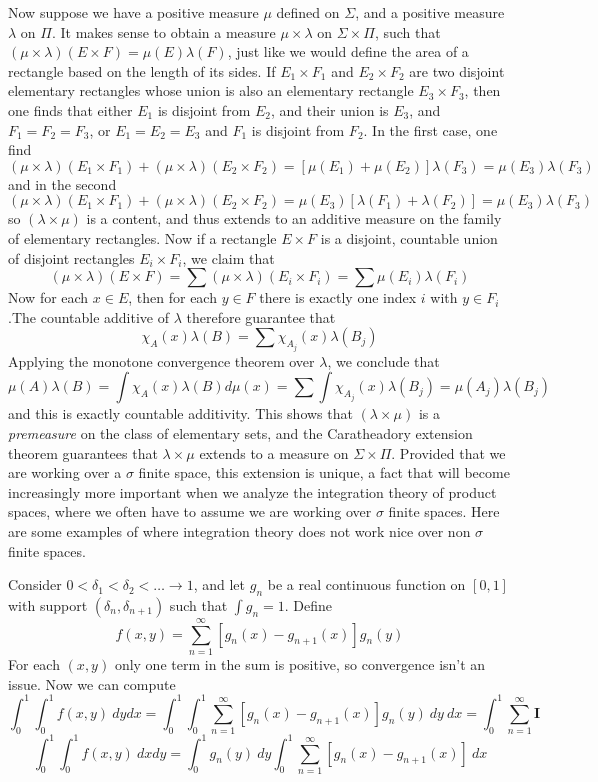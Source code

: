Now suppose we have a positive measure $\mu$ defined on $\Sigma$, and a positive measure $\lambda$ on $\Pi$. It makes sense to obtain a measure $\mu \times \lambda$ on $\Sigma \times \Pi$, such that $(\mu \times \lambda)(E \times F) = \mu(E) \lambda(F)$, just like we would define the area of a rectangle based on the length of its sides. If $E_1 \times F_1$ and $E_2 \times F_2$ are two disjoint elementary rectangles whose union is also an elementary rectangle $E_3 \times F_3$, then one finds that either $E_1$ is disjoint from $E_2$, and their union is $E_3$, and $F_1 = F_2 = F_3$, or $E_1 = E_2 = E_3$ and $F_1$ is disjoint from $F_2$. In the first case, one find
%
\[ (\mu \times \lambda)(E_1 \times F_1) + (\mu \times \lambda)(E_2 \times F_2) = [\mu(E_1) + \mu(E_2)] \lambda(F_3) = \mu(E_3) \lambda(F_3) \]
%
and in the second
%
\[ (\mu \times \lambda)(E_1 \times F_1) + (\mu \times \lambda)(E_2 \times F_2) = \mu(E_3) [\lambda(F_1) + \lambda(F_2)] = \mu(E_3) \lambda(F_3) \]
%
so $(\lambda \times \mu)$ is a content, and thus extends to an additive measure on the family of elementary rectangles. Now if a rectangle $E \times F$ is a disjoint, countable union of disjoint rectangles $E_i \times F_i$, we claim that
%
\[ (\mu \times \lambda)(E \times F) = \sum (\mu \times \lambda)(E_i \times F_i) = \sum \mu(E_i) \lambda(F_i) \]
%
Now for each $x \in E$, then for each $y \in F$ there is exactly one index $i$ with $y \in F_i$.The countable additive of $\lambda$ therefore guarantee that
%
\[ \chi_A(x) \lambda(B) = \sum \chi_{A_j}(x) \lambda(B_j) \]
%
Applying the monotone convergence theorem over $\lambda$, we conclude that
%
\[ \mu(A) \lambda(B) = \int \chi_A(x) \lambda(B) d\mu(x) = \sum \int \chi_{A_j}(x) \lambda(B_j) = \mu(A_j) \lambda(B_j) \]
%
and this is exactly countable additivity. This shows that $(\lambda \times \mu)$ is a {\it premeasure} on the class of elementary sets, and the Caratheadory extension theorem guarantees that $\lambda \times \mu$ extends to a measure on $\Sigma \times \Pi$. Provided that we are working over a $\sigma$ finite space, this extension is unique, a fact that will become increasingly more important when we analyze the integration theory of product spaces, where we often have to assume we are working over $\sigma$ finite spaces. Here are some examples of where integration theory does not work nice over non $\sigma$ finite spaces.

\begin{example}
    Consider $0 < \delta_1 < \delta_2 < \dots \to 1$, and let $g_n$ be a real continuous function on $[0,1]$ with support $(\delta_n, \delta_{n+1})$ such that $\int g_n = 1$. Define
    \[ f(x,y) = \sum_{n = 1}^\infty [g_n(x) - g_{n+1}(x)] g_n(y) \]
    For each $(x,y)$ only one term in the sum is positive, so convergence isn't an issue. Now we can compute
    \[ \int_0^1 \int_0^1 f(x,y)\ dy dx = \int_0^1 \int_0^1 \sum_{n = 1}^\infty [g_n(x) - g_{n+1}(x)] g_n(y)\ dy\ dx = \int_0^1 \sum_{n = 1}^\infty \mathbf{I} \]
    \[ \int_0^1 \int_0^1 f(x,y)\ dx dy = \int_0^1 g_n(y)\ dy \int_0^1 \sum_{n = 1}^\infty [g_n(x) - g_{n+1}(x)]\ dx \]
\end{example}

